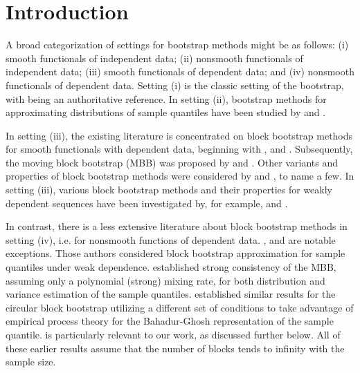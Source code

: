 \documentclass[a4paper, 12pt]{article}
\theoremstyle{plain}
\theoremstyle{definition}
\begin{document}
\section{Introduction}
\label{sec:intro}

A broad categorization of settings for bootstrap methods might be as follows: (i) smooth functionals of independent data; (ii) nonsmooth functionals of independent data; (iii) smooth functionals of dependent data; and (iv) nonsmooth functionals of dependent data. Setting (i) is the classic setting of the bootstrap, with \citet{Hall:1992} being an authoritative reference. In setting (ii), bootstrap methods for approximating distributions of sample quantiles have been studied by \citet{Efron:1979, BickelFreedman:1981, Singh:1981, Babu:1986, Efron:1982, GPSB:1984, HallSheather:1988, HDR:1989, HallMartin:1991, DEANGELIS:1993} and \citet{FalkJanas:1992}. 

In setting (iii), the existing literature is concentrated on block bootstrap methods for smooth functionals with dependent data, beginning with \citet{Hall:1985}, and \citet{Carlstein:1986}. Subsequently, the moving block bootstrap (MBB) was proposed by \citet{Kunsch:1989} and \citet{LiuSingh:1992}. Other variants and properties of block bootstrap methods were considered by \citet{PaparoditisPolitis:2001, PolitisRomano:1992, PolitisRomano:1994a} and \citet{PRW:1997}, to name a few. In setting (iii), various block bootstrap methods and their properties for weakly dependent sequences have been investigated by, for example, \citet{Buhlmann:1994, NNR:1994, HHJ:1995, GotzeKunsch:1996, Lahiri:1992, Lahiri:1996, Lahiri:1999} and \citet{BuhlmannKunsch:1999}. 

In contrast, there is a less extensive literature about block bootstrap methods in setting (iv), i.e. for nonsmooth functions of dependent data. \citet{SunLahiri:2006}, \citet{Sun:2007} and \citet{SharipovWendler:2013} are notable exceptions. Those authors considered block bootstrap approximation for sample quantiles under weak dependence. \citet{SunLahiri:2006} established strong consistency of the MBB, assuming only a polynomial (strong) mixing rate, for both distribution and variance estimation of the sample quantiles. \citet{SharipovWendler:2013} established similar results for the circular block bootstrap utilizing a different set of conditions to take advantage of empirical process theory for the Bahadur-Ghosh representation of the sample quantile. \citet{Sun:2007} is particularly relevant to our work, as discussed further below. All of these earlier results assume that the number of blocks tends to infinity with the sample size. 
\end{document}
